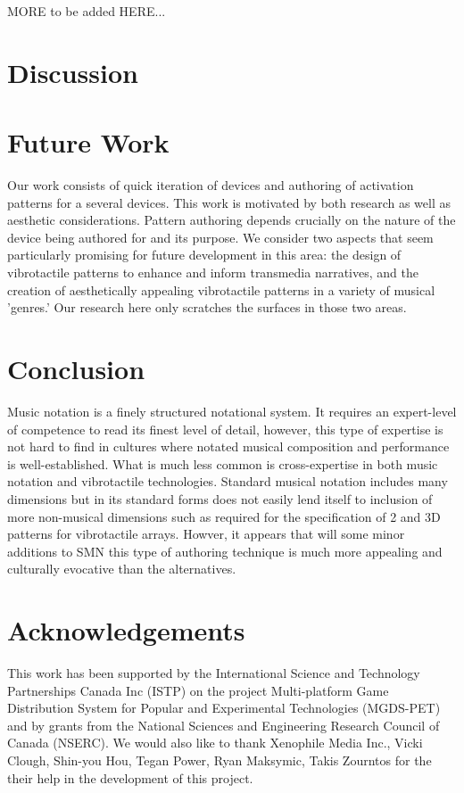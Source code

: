 \documentclass[a4paper, twocolumn]{article}
\begin{document}
MORE to be added HERE...

\section{Discussion}



\section{Future Work}


Our work consists of quick iteration of devices and authoring of activation patterns for a several devices. This work is motivated by both research as well as aesthetic considerations. Pattern authoring depends crucially on the nature of the device being authored for and its purpose. We consider two aspects that seem particularly promising for future development in this area: the design of vibrotactile patterns to enhance and inform transmedia narratives, and the creation of aesthetically appealing vibrotactile patterns in a variety of musical 'genres.' Our research here only scratches the surfaces in those two areas. 


\section{Conclusion}
Music notation is a finely structured notational system. It requires an expert-level of competence to read its finest level of detail, however, this type of expertise is not hard to find in cultures where notated musical composition and performance is well-established. What is much less common is cross-expertise in both music notation and vibrotactile technologies. Standard musical notation includes many dimensions but in its standard forms does not easily lend itself to inclusion of more non-musical dimensions such as required for the specification of 2 and 3D patterns for vibrotactile arrays. Howver, it appears that will some minor additions to SMN this type of authoring technique is much more appealing and culturally evocative than the alternatives. 

\section{Acknowledgements}
This work has been supported by the International Science and Technology Partnerships Canada Inc (ISTP) on the project Multi-platform Game Distribution System for Popular and Experimental Technologies (MGDS-PET) and by grants from the National Sciences and Engineering Research Council of Canada (NSERC). We would also like to thank Xenophile Media Inc., Vicki Clough, Shin-you Hou, Tegan Power, Ryan Maksymic, Takis Zourntos for the their help in the development of this project. 




  
\end{document}
